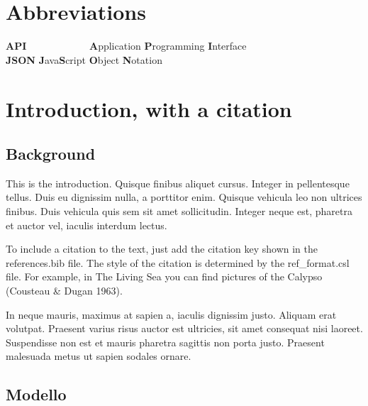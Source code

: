\documentclass[12pt,a4paper,]{report}
\begin{document}
\newpage

\hypertarget{abbreviations}{%
\chapter*{Abbreviations}\label{abbreviations}}

\begin{tabbing}
\textbf{API}~~~~~~~~~~~~ \= \textbf{A}pplication \textbf{P}rogramming \textbf{I}nterface \\  
\textbf{JSON} \> \textbf{J}ava\textbf{S}cript \textbf{O}bject \textbf{N}otation \\  
\end{tabbing}

\newpage

\setcounter{page}{1}
\doublespacing
\setlength{\parindent}{0.5in}

\hypertarget{introduction-with-a-citation}{%
\chapter{Introduction, with a
citation}\label{introduction-with-a-citation}}

\hypertarget{background}{%
\section{Background}\label{background}}

This is the introduction. Quisque finibus aliquet cursus. Integer in
pellentesque tellus. Duis eu dignissim nulla, a porttitor enim. Quisque
vehicula leo non ultrices finibus. Duis vehicula quis sem sit amet
sollicitudin. Integer neque est, pharetra et auctor vel, iaculis
interdum lectus.

To include a citation to the text, just add the citation key shown in
the references.bib file. The style of the citation is determined by the
ref\_format.csl file. For example, in The Living Sea you can find
pictures of the Calypso (Cousteau \& Dugan 1963).

In neque mauris, maximus at sapien a, iaculis dignissim justo. Aliquam
erat volutpat. Praesent varius risus auctor est ultricies, sit amet
consequat nisi laoreet. Suspendisse non est et mauris pharetra sagittis
non porta justo. Praesent malesuada metus ut sapien sodales ornare.

\hypertarget{modello}{%
\section{Modello}\label{modello}}
\end{document}
